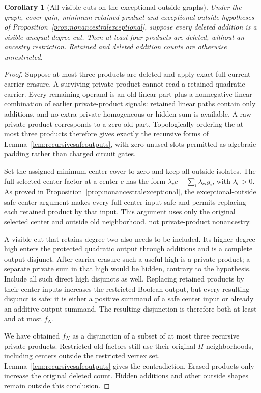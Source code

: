 \documentclass[11pt]{article}
\newtheorem{corollary}[theorem]{Corollary}
\theoremstyle{definition}
\theoremstyle{remark}
\begin{document}
\begin{corollary}[All visible cuts on the exceptional outside graphs]\label{cor:allvisibleexceptional}
Under the graph, cover-gain, minimum-retained-product and exceptional-outside hypotheses of Proposition~\ref{prop:nonancestralexceptional}, suppose every deleted addition is a visible unequal-degree cut. Then at least four products are deleted, without an ancestry restriction. Retained and deleted addition counts are otherwise unrestricted.
\end{corollary}
\begin{proof}
Suppose at most three products are deleted and apply exact full-current-carrier erasure. A surviving private product cannot read a retained quadratic carrier. Every remaining operand is an old linear part plus a nonnegative linear combination of earlier private-product signals: retained linear paths contain only additions, and no extra private homogeneous or hidden sum is available. A raw private product corresponds to a zero old part. Topologically ordering the at most three products therefore gives exactly the recursive forms of Lemma~\ref{lem:recursivesafeoutputs}, with zero unused slots permitted as algebraic padding rather than charged circuit gates.

Set the assigned minimum center cover to zero and keep all outside isolates. The full selected center factor at a center $c$ has the form $\lambda_c c+\sum_i\lambda_{ci}g_i$, with $\lambda_c>0$. As proved in Proposition~\ref{prop:nonancestralexceptional}, the exceptional-outside safe-center argument makes every full center input safe and permits replacing each retained product by that input. This argument uses only the original selected center and outside old neighborhood, not private-product nonancestry.

A visible cut that retains degree two also needs to be included. Its higher-degree high enters the protected quadratic output through additions and is a complete output disjunct. After carrier erasure such a useful high is a private product; a separate private sum in that high would be hidden, contrary to the hypothesis. Include all such direct high disjuncts as well. Replacing retained products by their center inputs increases the restricted Boolean output, but every resulting disjunct is safe: it is either a positive summand of a safe center input or already an additive output summand. The resulting disjunction is therefore both at least and at most $f_N$.

We have obtained $f_N$ as a disjunction of a subset of at most three recursive private products. Restricted old factors still use their original $H$-neighborhoods, including centers outside the restricted vertex set. Lemma~\ref{lem:recursivesafeoutputs} gives the contradiction. Erased products only increase the original deleted count. Hidden additions and other outside shapes remain outside this conclusion.
\end{proof}
\end{document}

